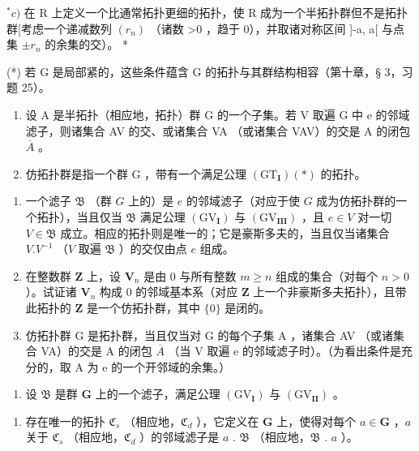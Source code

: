 \(^{*}c)\) 在 R 上定义一个比通常拓扑更细的拓扑，使 R 成为一个半拓扑群但不是拓扑群{[}考虑一个递减数列 \((r_{n})\) （诸数 \textgreater0 ，趋于 0），并取诸对称区间 {]}-a, a{[} 与点集 \(\pm r_{n}\) 的余集的交）。 *

(*) 若 G 是局部紧的，这些条件蕴含 G 的拓扑与其群结构相容（第十章，§ 3，习题 25）。

\begin{enumerate}
\def\labelenumi{\arabic{enumi})}
\setcounter{enumi}{2}
\item
  设 A 是半拓扑（相应地，拓扑）群 G 的一个子集。若 V 取遍 G 中 e 的邻域滤子，则诸集合 AV 的交、或诸集合 VA （或诸集合 VAV）的交是 A 的闭包 \(\overline{A}\) 。
\item
  仿拓扑群是指一个群 G ，带有一个满足公理 \((\mathrm{GT}_{\mathbf{I}})(*)\) 的拓扑。
\end{enumerate}

\begin{enumerate}
\def\labelenumi{\alph{enumi})}
\item
  一个滤子 \(\mathfrak{B}\) （群 \(G\) 上的）是 \(e\) 的邻域滤子（对应于使 \(G\) 成为仿拓扑群的一个拓扑），当且仅当 \(\mathfrak{B}\) 满足公理 \((\mathrm{GV}_{\mathbf{I}})\) 与 \((\mathrm{GV}_{\mathbf{III}})\) ，且 \(e \in V\) 对一切 \(V \in \mathfrak{B}\) 成立。相应的拓扑则是唯一的；它是豪斯多夫的，当且仅当诸集合 \(V.V^{-1}\) （\(V\) 取遍 \(\mathfrak{B}\) ）的交仅由点 \(e\) 组成。
\item
  在整数群 \(\mathbf{Z}\) 上，设 \(\mathbf{V}_n\) 是由 \(0\) 与所有整数 \(m \geqslant n\) 组成的集合（对每个 \(n > 0\) ）。试证诸 \(\mathbf{V}_n\) 构成 \(0\) 的邻域基本系（对应 \(\mathbf{Z}\) 上一个非豪斯多夫拓扑），且带此拓扑的 \(\mathbf{Z}\) 是一个仿拓扑群，其中 \(\{0\}\) 是闭的。
\item
  仿拓扑群 G 是拓扑群，当且仅当对 G 的每个子集 A ，诸集合 AV （或诸集合 VA）的交是 A 的闭包 \(\overline{A}\) （当 V 取遍 e 的邻域滤子时）。（为看出条件是充分的，取 A 为 e 的一个开邻域的余集。）
\end{enumerate}

\begin{enumerate}
\def\labelenumi{\arabic{enumi})}
\setcounter{enumi}{4}
\tightlist
\item
  设 \(\mathfrak{B}\) 是群 \(\mathbf{G}\) 上的一个滤子，满足公理 \((\mathrm{GV}_{\mathbf{I}})\) 与 \((\mathrm{GV}_{\mathbf{II}})\) 。
\end{enumerate}

\begin{enumerate}
\def\labelenumi{\alph{enumi})}
\tightlist
\item
  存在唯一的拓扑 \(\mathfrak{C}_s\) （相应地，\(\mathfrak{C}_d\) ），它定义在 \(\mathbf{G}\) 上，使得对每个 \(a \in \mathbf{G}\) ，\(a\) 关于 \(\mathfrak{C}_s\) （相应地，\(\mathfrak{C}_d\) ）的邻域滤子是 \(a\) . \(\mathfrak{B}\) （相应地，\(\mathfrak{B}\) . \(a\) ）。
\end{enumerate}

